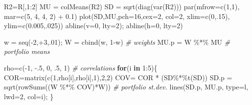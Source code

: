 \documentclass[
  oneside]{book}
\newenvironment{Shaded}{\begin{snugshade}}{\end{snugshade}}
\newcommand{\AttributeTok}[1]{\textcolor[rgb]{0.77,0.63,0.00}{#1}}
\newcommand{\CommentTok}[1]{\textcolor[rgb]{0.56,0.35,0.01}{\textit{#1}}}
\newcommand{\ControlFlowTok}[1]{\textcolor[rgb]{0.13,0.29,0.53}{\textbf{#1}}}
\newcommand{\DecValTok}[1]{\textcolor[rgb]{0.00,0.00,0.81}{#1}}
\newcommand{\FloatTok}[1]{\textcolor[rgb]{0.00,0.00,0.81}{#1}}
\newcommand{\FunctionTok}[1]{\textcolor[rgb]{0.00,0.00,0.00}{#1}}
\newcommand{\NormalTok}[1]{#1}
\newcommand{\OtherTok}[1]{\textcolor[rgb]{0.56,0.35,0.01}{#1}}
\newcommand{\SpecialCharTok}[1]{\textcolor[rgb]{0.00,0.00,0.00}{#1}}
\newcommand{\StringTok}[1]{\textcolor[rgb]{0.31,0.60,0.02}{#1}}
\begin{document}
\begin{Shaded}
\begin{Highlighting}[]
\NormalTok{R2}\OtherTok{=}\NormalTok{R[,}\DecValTok{1}\SpecialCharTok{:}\DecValTok{2}\NormalTok{]}
\NormalTok{MU }\OtherTok{=} \FunctionTok{colMeans}\NormalTok{(R2)}
\NormalTok{SD }\OtherTok{=} \FunctionTok{sqrt}\NormalTok{(}\FunctionTok{diag}\NormalTok{(}\FunctionTok{var}\NormalTok{(R2)))}
\FunctionTok{par}\NormalTok{(}\AttributeTok{mfrow=}\FunctionTok{c}\NormalTok{(}\DecValTok{1}\NormalTok{,}\DecValTok{1}\NormalTok{), }\AttributeTok{mar=}\FunctionTok{c}\NormalTok{(}\DecValTok{5}\NormalTok{, }\DecValTok{4}\NormalTok{, }\DecValTok{4}\NormalTok{, }\DecValTok{2}\NormalTok{) }\SpecialCharTok{+} \FloatTok{0.1}\NormalTok{)}
\FunctionTok{plot}\NormalTok{(SD,MU,}\AttributeTok{pch=}\DecValTok{16}\NormalTok{,}\AttributeTok{cex=}\DecValTok{2}\NormalTok{, }\AttributeTok{col=}\DecValTok{2}\NormalTok{, }\AttributeTok{xlim=}\FunctionTok{c}\NormalTok{(}\DecValTok{0}\NormalTok{,.}\DecValTok{15}\NormalTok{), }\AttributeTok{ylim=}\FunctionTok{c}\NormalTok{(}\FloatTok{0.005}\NormalTok{,.}\DecValTok{025}\NormalTok{))}
\FunctionTok{abline}\NormalTok{(}\AttributeTok{v=}\DecValTok{0}\NormalTok{, }\AttributeTok{lty=}\DecValTok{2}\NormalTok{); }\FunctionTok{abline}\NormalTok{(}\AttributeTok{h=}\DecValTok{0}\NormalTok{, }\AttributeTok{lty=}\DecValTok{2}\NormalTok{) }

\NormalTok{w }\OtherTok{=} \FunctionTok{seq}\NormalTok{(}\SpecialCharTok{{-}}\DecValTok{2}\NormalTok{,}\SpecialCharTok{+}\DecValTok{3}\NormalTok{,.}\DecValTok{01}\NormalTok{); W }\OtherTok{=} \FunctionTok{cbind}\NormalTok{(w, }\DecValTok{1}\SpecialCharTok{{-}}\NormalTok{w) }\CommentTok{\# weights}
\NormalTok{MU.p }\OtherTok{=}\NormalTok{ W }\SpecialCharTok{\%*\%}\NormalTok{ MU    }\CommentTok{\# portfolio means}

\NormalTok{rho}\OtherTok{=}\FunctionTok{c}\NormalTok{(}\SpecialCharTok{{-}}\DecValTok{1}\NormalTok{, }\SpecialCharTok{{-}}\NormalTok{.}\DecValTok{5}\NormalTok{, }\DecValTok{0}\NormalTok{, .}\DecValTok{5}\NormalTok{, }\DecValTok{1}\NormalTok{) }\CommentTok{\# correlations}
\ControlFlowTok{for}\NormalTok{(i }\ControlFlowTok{in} \DecValTok{1}\SpecialCharTok{:}\DecValTok{5}\NormalTok{)\{}
\NormalTok{  COR}\OtherTok{=}\FunctionTok{matrix}\NormalTok{(}\FunctionTok{c}\NormalTok{(}\DecValTok{1}\NormalTok{,rho[i],rho[i],}\DecValTok{1}\NormalTok{),}\DecValTok{2}\NormalTok{,}\DecValTok{2}\NormalTok{)}
\NormalTok{  COV}\OtherTok{=}\NormalTok{ COR }\SpecialCharTok{*}\NormalTok{ (SD}\SpecialCharTok{\%*\%}\FunctionTok{t}\NormalTok{(SD))}
\NormalTok{  SD.p }\OtherTok{=} \FunctionTok{sqrt}\NormalTok{(}\FunctionTok{rowSums}\NormalTok{((W }\SpecialCharTok{\%*\%}\NormalTok{ COV)}\SpecialCharTok{*}\NormalTok{W)) }\CommentTok{\# portfolio st.dev.}
  \FunctionTok{lines}\NormalTok{(SD.p, MU.p, }\AttributeTok{type=}\StringTok{\textquotesingle{}l\textquotesingle{}}\NormalTok{, }\AttributeTok{lwd=}\DecValTok{2}\NormalTok{, }\AttributeTok{col=}\NormalTok{i); }
\NormalTok{\}}


\end{Highlighting}
\end{Shaded}
\end{document}
